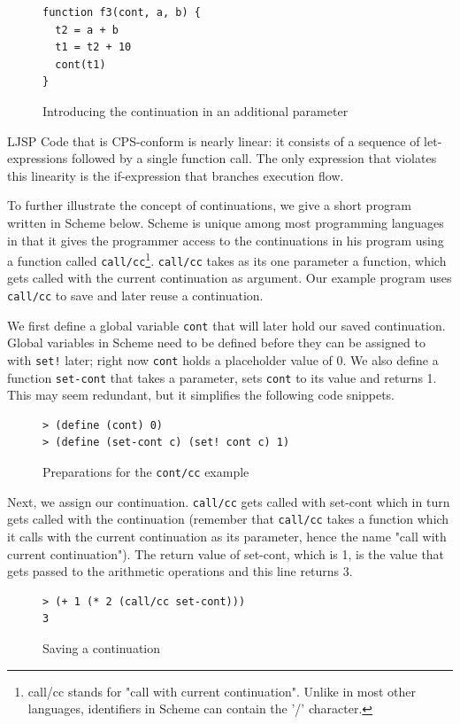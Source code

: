 \documentclass[11pt]{report}
\begin{document}
\begin{figure}[ht]
\begin{lstlisting}
function f3(cont, a, b) {
  t2 = a + b
  t1 = t2 + 10
  cont(t1)
}
\end{lstlisting}
\caption{Introducing the continuation in an additional parameter}
\label{cpsconvfunc4}
\end{figure}

LJSP Code that is CPS-conform is nearly linear: it consists of a sequence of let-expressions followed by a single function call. The only expression that violates this linearity is the if-expression that branches execution flow.

To further illustrate the concept of continuations, we give a short program written in Scheme below. Scheme is unique among most programming languages in that it gives the programmer access to the continuations in his program using a function called \texttt{call/cc}\footnote{call/cc stands for "call with current continuation". Unlike in most other languages, identifiers in Scheme can contain the '/' character.}. \texttt{call/cc} takes as its one parameter a function, which gets called with the current continuation as argument. Our example program uses \texttt{call/cc} to save and later reuse a continuation.

We first define a global variable \texttt{cont} that will later hold our saved continuation. Global variables in Scheme need to be defined before they can be assigned to with \texttt{set!} later; right now \texttt{cont} holds a placeholder value of 0. We also define a function \texttt{set-cont} that takes a parameter, sets \texttt{cont} to its value and returns 1. This may seem redundant, but it simplifies the following code snippets.
\begin{figure}[ht]
\begin{lstlisting}
> (define (cont) 0)
> (define (set-cont c) (set! cont c) 1)
\end{lstlisting}
\caption{Preparations for the \texttt{cont/cc} example}
\label{contcc1}
\end{figure}

Next, we assign our continuation. \texttt{call/cc} gets called with set-cont which in turn gets called with the continuation (remember that \texttt{call/cc} takes a function which it calls with the current continuation as its parameter, hence the name "call with current continuation"). The return value of set-cont, which is 1, is the value that gets passed to the arithmetic operations and this line returns 3.
\begin{figure}[ht]
\begin{lstlisting}
> (+ 1 (* 2 (call/cc set-cont)))
3
\end{lstlisting}
\caption{Saving a continuation}
\label{contcc2}
\end{figure}
\end{document}
